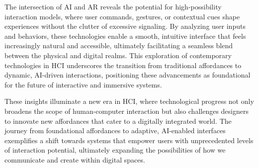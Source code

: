 The intersection of AI and AR reveals the potential for high-possibility interaction models, where user commands, gestures, or contextual cues shape experiences without the clutter of excessive signaling.
By analyzing user inputs and behaviors, these technologies enable a smooth, intuitive interface that feels increasingly natural and accessible, ultimately facilitating a seamless blend between the physical and digital realms.
This exploration of contemporary technologies in HCI underscores the transition from traditional affordances to dynamic, AI-driven interactions, positioning these advancements as foundational for the future of interactive and immersive systems.

These insights illuminate a new era in HCI, where technological progress not only broadens the scope of human-computer interaction but also challenges designers to innovate new affordances that cater to a digitally integrated world.
The journey from foundational affordances to adaptive, AI-enabled interfaces exemplifies a shift towards systems that empower users with unprecedented levels of interaction potential, ultimately expanding the possibilities of how we communicate and create within digital spaces.